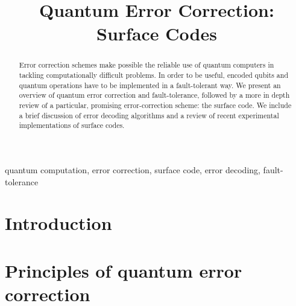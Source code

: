 \documentclass[conference]{IEEEtran}
\begin{document}
\title{Quantum Error Correction: Surface Codes}

\author{

  \and

}

\maketitle


\begin{abstract}
Error correction schemes make possible the reliable use of quantum computers in
tackling computationally difficult problems. In order to be useful, encoded
qubits and quantum operations have to be implemented in a fault-tolerant way. We
present an overview of quantum error correction and fault-tolerance, followed by
a more in depth review of a particular, promising error-correction scheme: the
surface code. We include a brief discussion of error decoding algorithms and a
review of recent experimental implementations of surface codes.
\end{abstract}

\begin{IEEEkeywords}
  quantum computation, error correction, surface code, error decoding, fault-tolerance
\end{IEEEkeywords}

\section{Introduction}


\section{Principles of quantum error correction}

\end{document}
